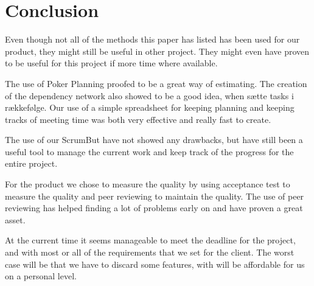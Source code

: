\section{Conclusion}
Even though not all of the methods this paper has listed has been used for our product, they might still be useful in other project. They might even have proven to be useful for this project if more time where available.

The use of Poker Planning proofed to be a great way of estimating. The creation of the dependency network also showed to be a good idea, when sætte tasks i rækkefølge.
Our use of a simple spreadsheet for keeping planning and keeping tracks of meeting time was both very effective and really fast to create.

The use of our ScrumBut have not showed any drawbacks, but have still been a useful tool to manage the current work and keep track of the progress for the entire project.

For the product we chose to measure the quality by using acceptance test to measure the quality and peer reviewing to maintain the quality.
The use of peer reviewing has helped finding a lot of problems early on and have proven a great asset.

At the current time it seems manageable to meet the deadline for the project, and with most or all of the requirements that we set for the client. The worst case will be that we have to discard some features, with will be affordable for us on a personal level. 
